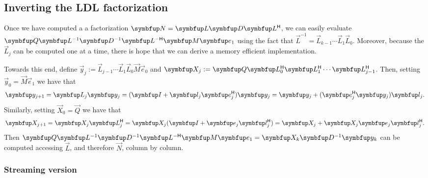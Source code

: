 \subsection{Inverting the LDL factorization}

Once we have computed a a factorization \( \vec{N} = \vec{L}\vec{D}\vec{L}^\cT \), we can easily evaluate $\vec{Q}\vec{L}^{-1}\vec{D}^{-1} \vec{L}^{-\cT}\vec{M}\vec{e}_1$ using the fact that \( \vec{L}^{-1} = \vec{L}_{k-1} \cdots \vec{L}_1 \vec{L}_0 \).
Moreover, because the \( \vec{L}_j \) can be computed one at a time, there is hope that we can derive a memory efficient implementation.

Towards this end, define \( \vec{y}_j := \vec{L}_{j-1} \cdots \vec{L}_1 \vec{L}_0 \vec{M}\vec{e}_0 \) and \( \vec{X}_j := \vec{Q} \vec{L}_0^\cT \vec{L}_1^\cT \cdots \vec{L}_{j-1}^\cT  \).
Then, setting \( \vec{y}_{0} = \vec{M} \vec{e}_1 \) we have that
\begin{equation*}
    \vec{y}_{j+1} 
    = \vec{L}_{j} \vec{y}_{j}
    = (\vec{I} + \vec{l}_j \vec{e}_j^\cT ) \vec{y}_{j}
    = \vec{y}_{j} +  (\vec{e}_{j}^\cT \vec{y}_{j}) \vec{l}_j.
\end{equation*}
Similarly, setting \( \vec{X}_{0} = \vec{Q} \) we have that
\begin{equation*}
    \vec{X}_{j+1} 
    = \vec{X}_{j} \vec{L}_j^\cT
    = \vec{X}_{j} ( \vec{I} + \vec{e}_j \vec{l}_j^\cT)
    = \vec{X}_{j} + \vec{X}_{j} \vec{e}_j \vec{l}_j^\cT.
\end{equation*}
Then \( \vec{Q}\vec{L}^{-1}\vec{D}^{-1} \vec{L}^{-\cT}\vec{M}\vec{e}_1 = \vec{X}_{k} \vec{D}^{-1} \vec{y}_{k} \) can be computed accessing \( \vec{L} \), and therefore \( \vec{N} \), column by column.

\subsubsection{Streaming version}
\label{sec:streaming_banded_solve}

